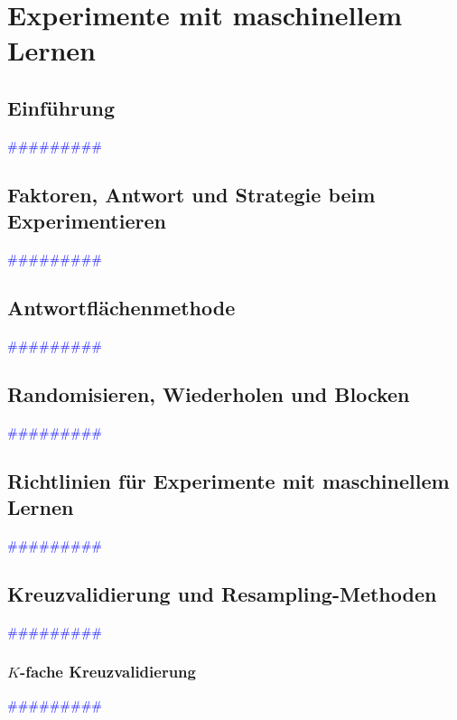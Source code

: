 \documentclass{article}
\begin{document}
\newpage
\section{Experimente mit maschinellem Lernen} %
  \subsection{Einführung} %
       \textcolor{blue}{\#\#\#\#\#\#\#\#\#}
  \subsection{Faktoren, Antwort und Strategie beim Experimentieren} %
       \textcolor{blue}{\#\#\#\#\#\#\#\#\#}
  \subsection{Antwortflächenmethode} %
       \textcolor{blue}{\#\#\#\#\#\#\#\#\#}
  \subsection{Randomisieren, Wiederholen und Blocken} %
       \textcolor{blue}{\#\#\#\#\#\#\#\#\#}
  \subsection{Richtlinien für Experimente mit maschinellem Lernen} %
       \textcolor{blue}{\#\#\#\#\#\#\#\#\#}
  \subsection{Kreuzvalidierung und Resampling-Methoden} %
       \textcolor{blue}{\#\#\#\#\#\#\#\#\#}
    \subsubsection{$K$-fache Kreuzvalidierung} %
       \textcolor{blue}{\#\#\#\#\#\#\#\#\#}
\end{document}

